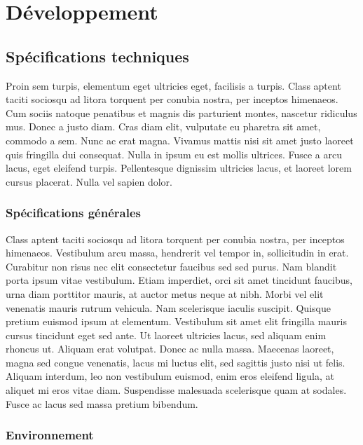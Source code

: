 \chapter{Développement}
\minitoc


\section{Spécifications techniques}

Proin sem turpis, elementum eget ultricies eget, facilisis a turpis. Class aptent taciti sociosqu ad litora torquent per conubia nostra, per inceptos himenaeos. Cum sociis natoque penatibus et magnis dis parturient montes, nascetur ridiculus mus. Donec a justo diam. Cras diam elit, vulputate eu pharetra sit amet, commodo a sem. Nunc ac erat magna. Vivamus mattis nisi sit amet justo laoreet quis fringilla dui consequat. Nulla in ipsum eu est mollis ultrices. Fusce a arcu lacus, eget eleifend turpis. Pellentesque dignissim ultricies lacus, et laoreet lorem cursus placerat. Nulla vel sapien dolor. 

\subsection{Spécifications générales}

Class aptent taciti sociosqu ad litora torquent per conubia nostra, per inceptos himenaeos. Vestibulum arcu massa, hendrerit vel tempor in, sollicitudin in erat. Curabitur non risus nec elit consectetur faucibus sed sed purus. Nam blandit porta ipsum vitae vestibulum. Etiam imperdiet, orci sit amet tincidunt faucibus, urna diam porttitor mauris, at auctor metus neque at nibh. Morbi vel elit venenatis mauris rutrum vehicula. Nam scelerisque iaculis suscipit. Quisque pretium euismod ipsum at elementum. Vestibulum sit amet elit fringilla mauris cursus tincidunt eget sed ante. Ut laoreet ultricies lacus, sed aliquam enim rhoncus ut. Aliquam erat volutpat. Donec ac nulla massa. Maecenas laoreet, magna sed congue venenatis, lacus mi luctus elit, sed sagittis justo nisi ut felis. Aliquam interdum, leo non vestibulum euismod, enim eros eleifend ligula, at aliquet mi eros vitae diam. Suspendisse malesuada scelerisque quam at sodales. Fusce ac lacus sed massa pretium bibendum. 

\subsection{Environnement}

